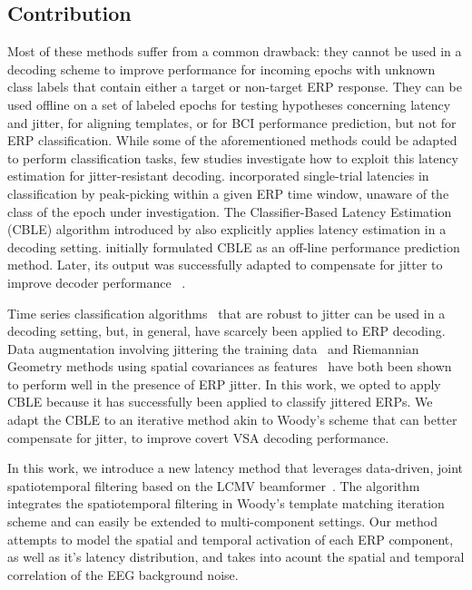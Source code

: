 \subsection{Contribution}

Most of these methods suffer from a common drawback: they cannot be used in a
decoding scheme to improve performance for incoming epochs with unknown
class labels that contain either a target or non-target ERP response.
They can be used offline on a set of labeled epochs for testing hypotheses
concerning latency and jitter, for aligning templates, or for BCI performance
prediction, but not for ERP classification.
While some of the aforementioned methods could be adapted to perform
classification tasks, few studies investigate how to exploit this latency estimation
for jitter-resistant decoding.
\cite{hardiansyah2020single} incorporated single-trial latencies in
classification by peak-picking within a given
ERP time window, unaware of the class of the epoch under investigation.
The Classifier-Based Latency Estimation (CBLE) algorithm introduced
by \cite{Thompson2012} also explicitly applies latency estimation in a
decoding setting.
\cite{Thompson2012} initially formulated CBLE as an off-line performance prediction method.
Later, its output was successfully adapted to compensate for jitter to improve decoder performance%
~\cite{Mowla2017,Zisk2022}.

Time series classification algorithms~\cite{Abanda2019}
that are robust to jitter can be used in a decoding setting,
but, in general, have scarcely been applied to ERP decoding.
Data augmentation involving jittering the training
data~\cite{Krell2018,Zisk2022} and Riemannian Geometry methods using spatial
covariances as features~\cite{Aydarkhanov2020} have both been shown
to perform well in the presence of ERP jitter.
In this work, we opted to apply CBLE because it has successfully been applied to
classify jittered ERPs.
We adapt the CBLE to an iterative method akin to Woody's scheme that can better
compensate for jitter, to improve covert VSA decoding performance.

In this work, we introduce a new latency method that leverages data-driven,
joint spatiotemporal filtering based on the LCMV beamformer~\cite{Vliet2016}. The algorithm
integrates the spatiotemporal filtering in Woody's template matching iteration
scheme and can easily be extended to multi-component settings.
Our method attempts to model the spatial and temporal activation of
each ERP component, as well as it's latency distribution, and takes into acount the
spatial and temporal correlation of the EEG background noise.

